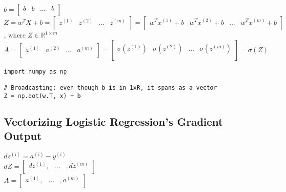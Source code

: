 \documentclass{article}
\begin{document}
$b =
\begin{bmatrix}
b & b & \dots & b\\
\end{bmatrix}
$\\

$Z =
w^T X +b =
\begin{bmatrix}
z^{(1)} & z^{(2)} & \dots & z^{(m)}\\
\end{bmatrix}
= \begin{bmatrix}
w^T x^{(1)} +b & w^T x^{(2)} +b & \dots & w^T x^{(m)} + b \\
\end{bmatrix}
$\\

, where $Z \in \mathbb{R}^{1 \times m}$\\

$A =
\begin{bmatrix}
a^{(1)} & a^{(2)} & \dots & a^{(m)}\\
\end{bmatrix}
=\begin{bmatrix}
\sigma(z^{(1)}) & \sigma(z^{(2)}) & \dots & \sigma(z^{(m)})\\
\end{bmatrix} = \sigma(Z)
$\\

\lstset{language=Python}
\begin{lstlisting}
import numpy as np

# Broadcasting: even though b is in 1xR, it spans as a vector
Z = np.dot(w.T, x) + b

\end{lstlisting}

\newpage
\subsection{Vectorizing Logistic Regression's Gradient Output}

$dz^{(i)} = a^{(i)}- y^{(i)}$\\
$dZ = \begin{bmatrix}
dz^{(1)}, & \dots & , dz^{(m)} \\
\end{bmatrix} $\\

$A = \begin{bmatrix}
a^{(1)}, & \dots & , a^{(m)} \\
\end{bmatrix} $\\
\end{document}
